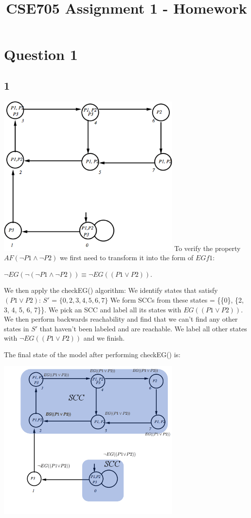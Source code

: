 \documentclass{scrartcl}
\title{CSE705 Assignment 1 - Homework}
\begin{document}
\setcounter{secnumdepth}{0}
\setlength{\parskip}{10pt plus 1pt minus 1pt}

\section{Question 1}

\subsection{1}
\includegraphics[width=3.6in]{q1model}
\newline
To verify the property $AF(\neg P1 \wedge \neg P2)$ we first need to transform it into the form of $EGf1$:

$\neg EG(\neg ( \neg P1 \wedge \neg P2)) \equiv \neg EG((P1 \vee P2))$.

We then apply the checkEG() algorithm: We identify states that satisfy $(P1 \vee P2)$: $S'$ = $\{0, 2, 3, 4, 5, 6, 7\}$
We form SCCs from these states = \{\{0\}, \{2, 3, 4, 5, 6, 7\}\}.
We pick an SCC and label all its states with $EG((P1 \vee P2))$.
We then perform backwards reachability and find that we can't find any other states in $S'$ that haven't been labeled and are reachable.
We label all other states with $\neg EG((P1 \vee P2))$ and we finish.

The final state of the model after performing checkEG() is:

\includegraphics[width=3.6in]{q1modelchecked}
\end{document}

